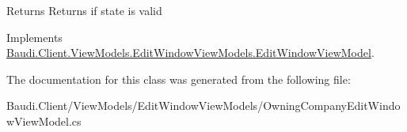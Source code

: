 \begin{DoxyReturn}{Returns}
Returns if state is valid
\end{DoxyReturn}


Implements \hyperlink{class_baudi_1_1_client_1_1_view_models_1_1_edit_window_view_models_1_1_edit_window_view_model_aeae328bfe7608e01ce3c54da0c13f781}{Baudi.\+Client.\+View\+Models.\+Edit\+Window\+View\+Models.\+Edit\+Window\+View\+Model}.



The documentation for this class was generated from the following file\+:\begin{DoxyCompactItemize}
\item 
Baudi.\+Client/\+View\+Models/\+Edit\+Window\+View\+Models/Owning\+Company\+Edit\+Window\+View\+Model.\+cs\end{DoxyCompactItemize}
